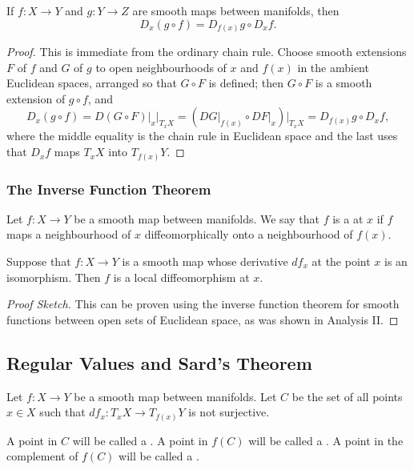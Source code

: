 \begin{theorem}
    If $f: X \rightarrow Y$ and $g: Y \rightarrow Z$ are smooth maps between manifolds, then
    $$
    D_x(g \circ f) = D_{f(x)} g \circ D_x f.
    $$
\end{theorem}
\begin{proof}
    This is immediate from the ordinary chain rule. Choose smooth extensions $F$ of $f$ and $G$ of $g$ to open neighbourhoods of $x$ and $f(x)$ in the ambient Euclidean spaces, arranged so that $G \circ F$ is defined; then $G \circ F$ is a smooth extension of $g \circ f$, and
    $$
    D_x(g\circ f) = \left. D(G\circ F)\right|_x \big|_{T_xX} = \left(\left.DG\right|_{f(x)}\circ \left.DF\right|_x\right)\big|_{T_xX} = D_{f(x)}g \circ D_x f,
    $$
    where the middle equality is the chain rule in Euclidean space and the last uses that $D_xf$ maps $T_xX$ into $T_{f(x)}Y$.
\end{proof}


\subsubsection{The Inverse Function Theorem}

Let $f: X \rightarrow Y$ be a smooth map between manifolds. We say that $f$ is a  at $x$ if $f$ maps a neighbourhood of $x$ diffeomorphically onto a neighbourhood of $f(x)$.

\begin{theorem}
    Suppose that $f: X \rightarrow Y$ is a smooth map whose derivative $d f_{x}$ at the point $x$ is an isomorphism. Then $f$ is a local diffeomorphism at $x$.
\end{theorem}
\begin{proof}[Proof Sketch]
    This can be proven using the inverse function theorem for smooth functions between open sets of Euclidean space, as was shown in Analysis II.
\end{proof}


\subsection{Regular Values and Sard's Theorem}
Let $f: X \rightarrow Y$ be a smooth map between manifolds. Let $C$ be the set of all points $x \in X$ such that $d f_{x}: T_{x} X \rightarrow T_{f(x)} Y$ is not surjective.

\begin{definition}
    A point in $C$ will be called a . A point in $f(C)$ will be called a . A point in the complement of $f(C)$ will be called a .
\end{definition}

